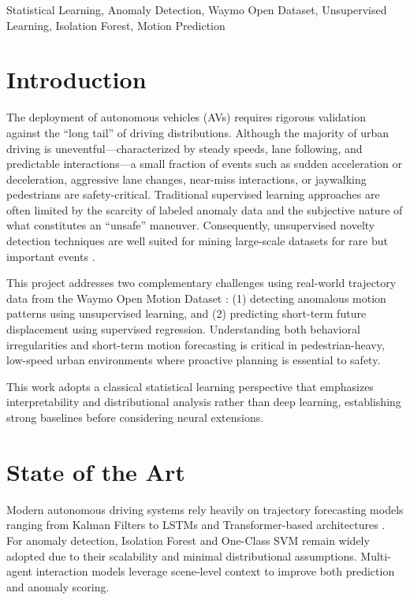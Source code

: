 \documentclass[conference]{IEEEtran}
\begin{document}
\begin{IEEEkeywords}
Statistical Learning, Anomaly Detection, Waymo Open Dataset, Unsupervised Learning, Isolation Forest, Motion Prediction
\end{IEEEkeywords}

\section{Introduction}

The deployment of autonomous vehicles (AVs) requires rigorous validation against the ``long tail'' of driving distributions. Although the majority of urban driving is uneventful---characterized by steady speeds, lane following, and predictable interactions---a small fraction of events such as sudden acceleration or deceleration, aggressive lane changes, near-miss interactions, or jaywalking pedestrians are safety-critical. Traditional supervised learning approaches are often limited by the scarcity of labeled anomaly data and the subjective nature of what constitutes an ``unsafe'' maneuver. Consequently, unsupervised novelty detection techniques are well suited for mining large-scale datasets for rare but important events \cite{pimentel2014review}.

This project addresses two complementary challenges using real-world trajectory data from the Waymo Open Motion Dataset \cite{ettinger2021waymo}: (1) detecting anomalous motion patterns using unsupervised learning, and (2) predicting short-term future displacement using supervised regression. Understanding both behavioral irregularities and short-term motion forecasting is critical in pedestrian-heavy, low-speed urban environments where proactive planning is essential to safety.

This work adopts a classical statistical learning perspective that emphasizes interpretability and distributional analysis rather than deep learning, establishing strong baselines before considering neural extensions.

\section{State of the Art}

Modern autonomous driving systems rely heavily on trajectory forecasting models ranging from Kalman Filters to LSTMs and Transformer-based architectures \cite{pimentel2014review}. For anomaly detection, Isolation Forest \cite{liu2008isolation} and One-Class SVM \cite{scholkopf2001estimating} remain widely adopted due to their scalability and minimal distributional assumptions. Multi-agent interaction models leverage scene-level context to improve both prediction and anomaly scoring.
\end{document}
